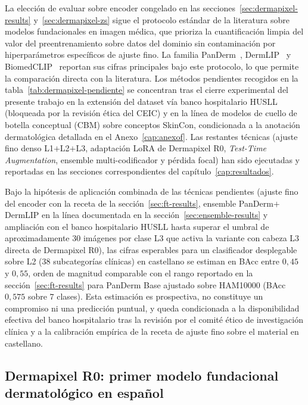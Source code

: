 La elección de evaluar sobre encoder congelado en las
secciones~\ref{sec:dermapixel-results} y~\ref{sec:dermapixel-zs}
sigue el protocolo estándar de la literatura sobre modelos
fundacionales en imagen médica, que prioriza la cuantificación
limpia del valor del preentrenamiento sobre datos del dominio sin
contaminación por hiperparámetros específicos de ajuste fino. La
familia PanDerm~\cite{panderm2025}, DermLIP~\cite{derm1m} y
BiomedCLIP~\cite{biomedclip} reportan sus cifras principales bajo
este protocolo, lo que permite la comparación directa con la
literatura. Los métodos pendientes recogidos en la
tabla~\ref{tab:dermapixel-pendiente} se concentran tras el cierre
experimental del presente trabajo en la extensión del dataset vía
banco hospitalario HUSLL (bloqueada por la revisión ética del
CEIC) y en la línea de modelos de cuello de botella conceptual
(CBM) sobre conceptos SkinCon, condicionada a la anotación
dermatológica detallada en el Anexo~\ref{cap:anexof}. Las
restantes técnicas (ajuste fino denso L1$+$L2$+$L3,
adaptación LoRA de Dermapixel R0, \emph{Test-Time Augmentation},
ensemble multi-codificador y pérdida focal) han sido ejecutadas y
reportadas en las secciones correspondientes del
capítulo~\ref{cap:resultados}.

Bajo la hipótesis de aplicación combinada de las técnicas
pendientes (ajuste fino del encoder con la receta de la
sección~\ref{sec:ft-results}, ensemble PanDerm$+$DermLIP en la
línea documentada en la sección~\ref{sec:ensemble-results} y
ampliación con el banco hospitalario HUSLL hasta superar el umbral
de aproximadamente $30$ imágenes por clase L3 que activa la
variante con cabeza L3 directa de Dermapixel R0), las cifras esperables para un
clasificador desplegable sobre L2 ($38$ subcategorías clínicas)
en castellano se estiman en BAcc entre $0{,}45$ y $0{,}55$,
orden de magnitud comparable con el rango reportado en la
sección~\ref{sec:ft-results} para PanDerm Base ajustado sobre
HAM10000 (BAcc $0{,}575$ sobre $7$ clases). Esta estimación es
prospectiva, no constituye un compromiso ni una predicción puntual,
y queda condicionada a la disponibilidad efectiva del banco
hospitalario tras la revisión por el comité ético de investigación
clínica y a la calibración empírica de la receta de ajuste fino
sobre el material en castellano.

\subsection{Dermapixel R0: primer modelo fundacional dermatológico
en español}
\label{sec:linea-spanderm}

